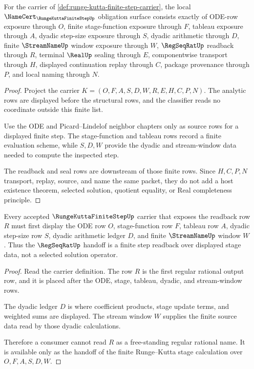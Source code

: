 \begin{theorem}
\label{thm:runge-kutta-finite-step-namecert-obligations}
For the carrier of \autoref{def:runge-kutta-finite-step-carrier}, the local $\NameCert_{\RungeKuttaFiniteStepUp}$ obligation surface consists exactly of ODE-row exposure through $O$, finite stage-function exposure through $F$, tableau exposure through $A$, dyadic step-size exposure through $S$, dyadic arithmetic through $D$, finite $\StreamNameUp$ window exposure through $W$, $\RegSeqRatUp$ readback through $R$, terminal $\RealUp$ sealing through $E$, componentwise transport through $H$, displayed continuation replay through $C$, package provenance through $P$, and local naming through $N$.
\end{theorem}
\begin{proof}
Project the carrier $K=(O,F,A,S,D,W,R,E,H,C,P,N)$. The analytic rows are displayed before the structural rows, and the classifier reads no coordinate outside this finite list.

Use the ODE and Picard--Lindelof neighbor chapters only as source rows for a displayed finite step. The stage-function and tableau rows record a finite evaluation scheme, while $S,D,W$ provide the dyadic and stream-window data needed to compute the inspected step.

The readback and seal rows are downstream of those finite rows. Since $H,C,P,N$ transport, replay, source, and name the same packet, they do not add a host existence theorem, selected solution, quotient equality, or Real completeness principle.
\end{proof}

\begin{theorem}
\label{thm:runge-kutta-finite-step-regseqrat-handoff}
Every accepted $\RungeKuttaFiniteStepUp$ carrier that exposes the readback row $R$ must first display the ODE row $O$, stage-function row $F$, tableau row $A$, dyadic step-size row $S$, dyadic arithmetic ledger $D$, and finite $\StreamNameUp$ window $W$. Thus the $\RegSeqRatUp$ handoff is a finite step readback over displayed stage data, not a selected solution operator.
\end{theorem}
\begin{proof}
Read the carrier definition. The row $R$ is the first regular rational output row, and it is placed after the ODE, stage, tableau, dyadic, and stream-window rows.

The dyadic ledger $D$ is where coefficient products, stage update terms, and weighted sums are displayed. The stream window $W$ supplies the finite source data read by those dyadic calculations.

Therefore a consumer cannot read $R$ as a free-standing regular rational name. It is available only as the handoff of the finite Runge--Kutta stage calculation over $O,F,A,S,D,W$.
\end{proof}

